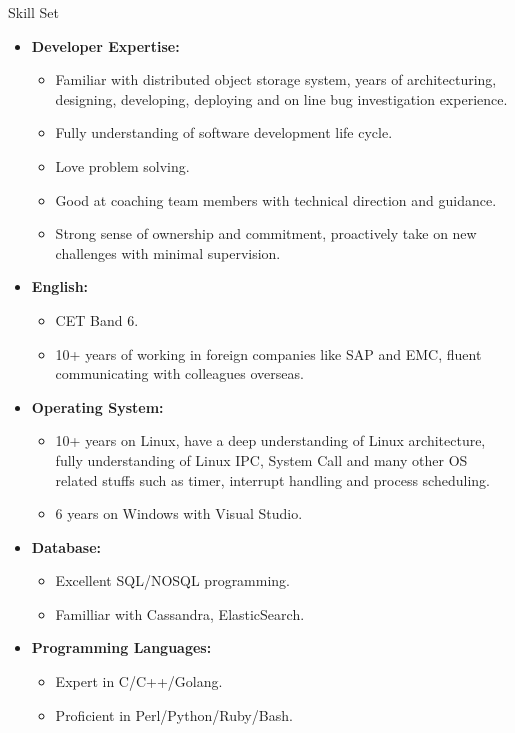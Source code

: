 \documentclass[11pt,oneside]{article}
\newenvironment{ressection}[1]{
	\vspace{4pt}
	{\selectfont\Large#1}
	\begin{itemize}
	\vspace{3pt}
}{
	\end{itemize}
}
\newcommand{\resitem}[1]{
	\vspace{-4pt}
	\item \begin{flushleft} #1 \end{flushleft}
}
\newcommand{\ressubitem}[1]{
	\vspace{-1pt}
	\item \begin{flushleft} #1 \end{flushleft}
}
\newenvironment{reslist}[1]{
	\resitem{\textbf{#1}}
	\vspace{-5pt}
	\begin{itemize}
}{
	\end{itemize}
}
\begin{document}
\begin{ressection}{Skill Set}

	\begin{reslist}{Developer Expertise:}
		\ressubitem{Familiar with distributed object storage system, years of architecturing, designing, developing, deploying and on line bug investigation experience.}
		\ressubitem{Fully understanding of software development life cycle.}
		\ressubitem{Love problem solving.}
		\ressubitem{Good at coaching team members with technical direction and guidance.}
		\ressubitem{Strong sense of ownership and commitment, proactively take on new challenges with minimal supervision.}
	\end{reslist}

	\begin{reslist}{English:}
		\ressubitem{CET Band 6.}
		\ressubitem{10+ years of working in foreign companies like SAP and EMC, fluent communicating with colleagues overseas.}
	\end{reslist}

	\begin{reslist}{Operating System:}
		\ressubitem{10+ years on Linux, have a deep understanding of Linux architecture,
			fully understanding of Linux IPC, System Call and
			many other OS related stuffs such as timer, interrupt handling and process scheduling.}
		\ressubitem{6 years on Windows with Visual Studio.}
	\end{reslist}

	\begin{reslist}{Database:}
		\ressubitem{Excellent SQL/NOSQL programming.}
		\ressubitem{Familliar with Cassandra, ElasticSearch.}
	\end{reslist}

	\begin{reslist}{Programming Languages:}
		\ressubitem{Expert in C/C++/Golang.}
		\ressubitem{Proficient in Perl/Python/Ruby/Bash.}
	\end{reslist}

\end{ressection}
\end{document}

